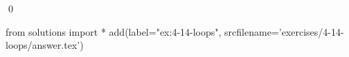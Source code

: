 
\begin{ex}
  \label{ex:4-14-loops}
  
  \qed
\end{ex}
\begin{python0}
from solutions import *
add(label="ex:4-14-loops",
    srcfilename='exercises/4-14-loops/answer.tex')
\end{python0}

